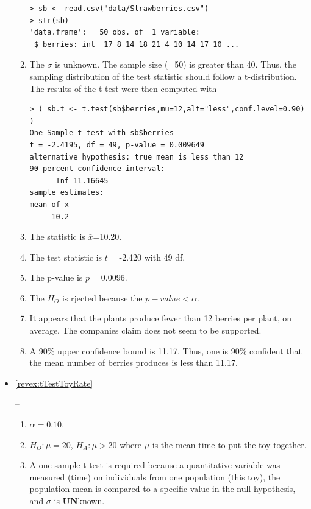 \documentclass[10pt,openany]{book}\usepackage[]{graphicx}\usepackage[]{color}
\makeatletter
\newenvironment{kframe}{%
 \def\at@end@of@kframe{}%
 \ifinner\ifhmode%
  \def\at@end@of@kframe{\end{minipage}}%
  \begin{minipage}{\columnwidth}%
 \fi\fi%
 \def\FrameCommand##1{\hskip\@totalleftmargin \hskip-\fboxsep
 \colorbox{shadecolor}{##1}\hskip-\fboxsep
     \hskip-\linewidth \hskip-\@totalleftmargin \hskip\columnwidth}%
 \MakeFramed {\advance\hsize-\width
   \@totalleftmargin\z@ \linewidth\hsize
   \@setminipage}}%
 {\par\unskip\endMakeFramed%
 \at@end@of@kframe}
\newenvironment{knitrout}{}{} %
\makeatother
\begin{document}
\begin{itemize}
\begin{enumerate}
\begin{knitrout}
\begin{kframe}
\begin{verbatim}
> sb <- read.csv("data/Strawberries.csv")
> str(sb)
'data.frame':	50 obs. of  1 variable:
 $ berries: int  17 8 14 18 21 4 10 14 17 10 ...
\end{verbatim}
\end{kframe}
\end{knitrout}
      \item The $\sigma$ is unknown.  The sample size (=50) is greater than 40.  Thus, the sampling distribution of the test statistic should follow a t-distribution.  The results of the t-test were then computed with
\begin{knitrout}
\color{fgcolor}\begin{kframe}
\begin{verbatim}
> ( sb.t <- t.test(sb$berries,mu=12,alt="less",conf.level=0.90) )
One Sample t-test with sb$berries 
t = -2.4195, df = 49, p-value = 0.009649
alternative hypothesis: true mean is less than 12 
90 percent confidence interval:
     -Inf 11.16645 
sample estimates:
mean of x 
     10.2 
\end{verbatim}
\end{kframe}
\end{knitrout}
      \item The statistic is $\bar{x}$=10.20.
      \item The test statistic is $t=$-2.420 with 49 df.
      \item The p-value is $p=0.0096$.
      \item The $H_{O}$ is rjected because the $p-value<\alpha$.
      \item It appears that the plants produce fewer than 12 berries per plant, on average.  The companies claim does not seem to be supported.
      \item A 90\% upper confidence bound is 11.17.  Thus, one is 90\% confident that the mean number of berries produces is less than 11.17.
    \end{enumerate}
  \item \hypertarget{ans:tTestToyRate}{\ref{revex:tTestToyRate}} --
    \begin{enumerate}
      \item $\alpha=0.10$.
      \item $H_{O}:\mu=20$, $H_{A}:\mu>20$ where $\mu$ is the mean time to put the toy together.
      \item A one-sample t-test is required because a quantitative variable was measured (time) on individuals from one population (this toy), the population mean is compared to a specific value in the null hypothesis, and $\sigma$ is \textbf{UN}known.

\end{enumerate}
\end{itemize}
\end{document}
